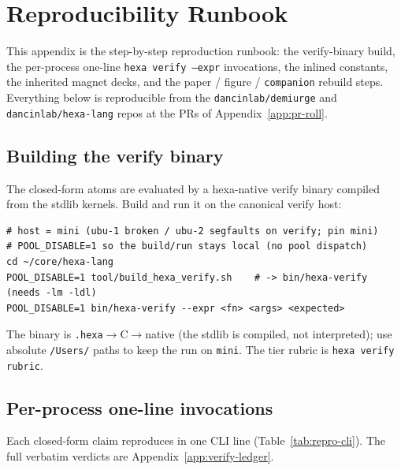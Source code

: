 \section{Reproducibility Runbook}
\label{app:repro}

This appendix is the step-by-step reproduction runbook: the verify-binary
build, the per-process one-line \texttt{hexa verify --expr} invocations, the
inlined constants, the inherited magnet decks, and the paper / figure /
\texttt{companion} rebuild steps. Everything below is reproducible from the
\texttt{dancinlab/demiurge} and \texttt{dancinlab/hexa-lang} repos at the
PRs of Appendix~\ref{app:pr-roll}.

\subsection{Building the verify binary}
\label{app:repro-build}

The closed-form atoms are evaluated by a hexa-native verify binary compiled
from the stdlib kernels. Build and run it on the canonical verify host:
\begin{lstlisting}
# host = mini (ubu-1 broken / ubu-2 segfaults on verify; pin mini)
# POOL_DISABLE=1 so the build/run stays local (no pool dispatch)
cd ~/core/hexa-lang
POOL_DISABLE=1 tool/build_hexa_verify.sh    # -> bin/hexa-verify (needs -lm -ldl)
POOL_DISABLE=1 bin/hexa-verify --expr <fn> <args> <expected>
\end{lstlisting}
The binary is \texttt{.hexa}$\to$C$\to$native (the stdlib is compiled, not
interpreted); use absolute \texttt{/Users/} paths to keep the run on
\texttt{mini}. The tier rubric is \texttt{hexa verify rubric}.

\subsection{Per-process one-line invocations}
\label{app:repro-invoke}

Each closed-form claim reproduces in one CLI line (Table~\ref{tab:repro-cli}).
The full verbatim verdicts are Appendix~\ref{app:verify-ledger}.

